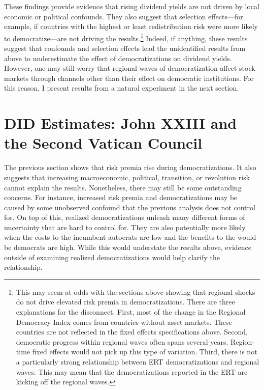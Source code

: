 \documentclass[12pt]{article}
\numberwithin{equation}{section}
\begin{document}
These findings provide evidence that rising dividend yields are not driven by local economic or political confounds. They also suggest that selection effects---for example, if countries with the highest or least redistribution risk were more likely to democratize---are not driving the results.\footnote{This may seem at odds with the sections above showing that regional shocks do not drive elevated risk premia in democratizations. There are three explanations for the disconnect. First, most of the change in the Regional Democracy Index comes from countries without asset markets. These countries are not reflected in the fixed effects specifications above. Second, democratic progress within regional waves often spans several years. Region-time fixed effects would not pick up this type of variation. Third, there is not a particularly strong relationship between ERT democratizations and regional waves. This may mean that the democratizations reported in the ERT are kicking off the regional waves.} Indeed, if anything, these results suggest that confounds and selection effects lead the unidentified results from above to underestimate the effect of democratizations on dividend yields. However, one may still worry that regional waves of democratization affect stock markets through channels other than their effect on democratic institutions. For this reason, I present results from a natural experiment in the next section.



\section{DID Estimates: John XXIII and the Second Vatican Council}\label{section:svc}

The previous section shows that risk premia rise during democratizations. It also suggests that increasing macroeconomic, political, transition, or revolution risk cannot explain the results. Nonetheless, there may still be some outstanding concerns. For instance, increased risk premia and democratizations may be caused by some unobserved confound that the previous analysis does not control for. On top of this, realized democratizations unleash many different forms of uncertainty that are hard to control for.  They are also potentially more likely when the costs to the incumbent autocrats are low and the benefits to the would-be democrats are high. While this would understate the results above, evidence outside of examining realized democratizations would help clarify the relationship.
\end{document}
